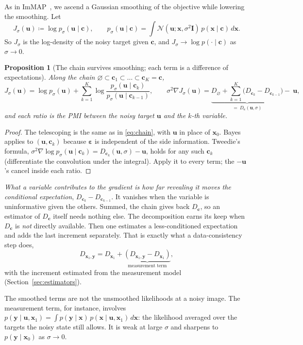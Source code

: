 \documentclass[11pt]{article}
\newtheorem{proposition}{Proposition}
\theoremstyle{remark}
\newcommand{\x}{\bm{x}}
\newcommand{\y}{\bm{y}}
\newcommand{\uu}{\bm{u}}
\newcommand{\eps}{\bm{\varepsilon}}
\newcommand{\cc}{\bm{c}}
\newcommand{\N}{\mathcal{N}}
\newcommand{\Id}{\bm{I}}
\newcommand{\grad}{\nabla}
\newcommand{\Dz}{D_{\varnothing}}
\newcommand{\Dg}{D_{\x_1}}
\newcommand{\Dgy}{D_{\x_1,\y}}
\begin{document}
As in ImMAP~\cite{ks2021}, we ascend a Gaussian smoothing of the objective while lowering the
smoothing. Let
\[
  J_\sigma(\uu) \coloneqq \log p_\sigma(\uu\mid\cc),\qquad
  p_\sigma(\uu\mid\cc) = \int\N(\uu;\x,\sigma^2\Id)\,p(\x\mid\cc)\,d\x .
\]
So $J_\sigma$ is the log-density of the noisy target given $\cc$, and $J_\sigma\to\log
p(\cdot\mid\cc)$ as $\sigma\to0$.

\begin{proposition}[The chain survives smoothing; each term is a difference of expectations]
\label{prop:grad}
Along the chain $\varnothing\subset\cc_1\subset\dots\subset\cc_K = \cc$,
\begin{equation}
  J_\sigma(\uu) = \log p_\sigma(\uu)
  + \sum_{k=1}^K \log\frac{p_\sigma(\uu\mid\cc_k)}{p_\sigma(\uu\mid\cc_{k-1})},
  \qquad
  \sigma^2\grad J_\sigma(\uu) = \underbrace{\Dz + \sum_{k=1}^K\big(D_{\cc_k}-D_{\cc_{k-1}}\big)}
  _{=\ D_{\cc}(\uu,\sigma)} -\ \uu ,
  \label{eq:grad}
\end{equation}
and each ratio is the PMI between the \emph{noisy} target $\uu$ and the $k$-th variable.
\end{proposition}
\begin{proof}
The telescoping is the same as in \eqref{eq:chain}, with $\uu$ in place of $\x_0$. Bayes applies
to $(\uu,\cc_k)$ because $\eps$ is independent of the side information. Tweedie's formula,
$\sigma^2\grad\log p_\sigma(\uu\mid\cc_k) = D_{\cc_k}(\uu,\sigma) - \uu$, holds for any such
$\cc_k$ (differentiate the convolution under the integral). Apply it to every term; the
$-\uu$'s cancel inside each ratio.
\end{proof}

\emph{What a variable contributes to the gradient is how far revealing it moves the conditional
expectation}, $D_{\cc_k} - D_{\cc_{k-1}}$. It vanishes when the variable is uninformative given
the others. Summed, the chain gives back $D_{\cc}$, so an estimator of $D_{\cc}$ itself needs
nothing else. The decomposition earns its keep when $D_{\cc}$ is \emph{not} directly
available. Then one estimates a less-conditioned expectation and adds the last increment
separately. That is exactly what a data-consistency step does,
\[
  \Dgy = \Dg + \underbrace{(\Dgy - \Dg)}_{\text{measurement term}},
\]
with the increment estimated from the measurement model (Section~\ref{sec:estimators}).

The smoothed terms are not the unsmoothed likelihoods at a noisy image. The measurement term,
for instance, involves $p(\y\mid\uu,\x_1) = \int p(\y\mid\x)\,p(\x\mid\uu,\x_1)\,d\x$: the
likelihood averaged over the targets the noisy state still allows. It is weak at large $\sigma$
and sharpens to $p(\y\mid\x_0)$ as $\sigma\to0$.
\end{document}
